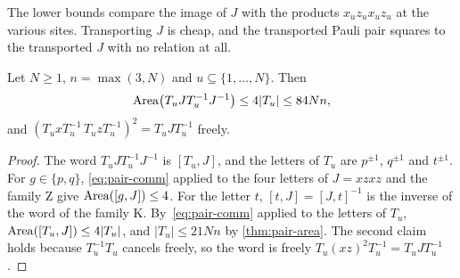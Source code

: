 The lower bounds compare the image of $J$ with the products $x_uz_ux_uz_u$ at the various sites. Transporting $J$ is cheap, and the
transported Pauli pair squares to the transported $J$ with no relation at all.

\begin{lemma}[Transporting $J$]\label{lem:J-transport}
Let $N\ge1$, $n=\max(3,N)$ and $u\subseteq\{1,\dots,N\}$. Then
\[
\operatorname{Area}\bigl(T_uJT_u^{-1}J^{-1}\bigr)\le4|T_u|\le84Nn,
\]
and $(T_uxT_u^{-1}\,T_uzT_u^{-1})^2=T_uJT_u^{-1}$ freely.
\end{lemma}

\begin{proof}
The word $T_uJT_u^{-1}J^{-1}$ is $[T_u,J]$, and the letters of $T_u$ are $p^{\pm1}$, $q^{\pm1}$ and $t^{\pm1}$. For $g\in\{p,q\}$,
\eqref{eq:pair-comm} applied to the four letters of $J=xzxz$ and the family \textsf{Z} give $\operatorname{Area}([g,J])\le4$. For the letter $t$,
$[t,J]=[J,t]^{-1}$ is the inverse of the word of the family \textsf{K}. By~\eqref{eq:pair-comm} applied to the letters of $T_u$,
$\operatorname{Area}([T_u,J])\le4|T_u|$, and $|T_u|\le21Nn$ by \cref{thm:pair-area}. The second claim holds because $T_u^{-1}T_u$ cancels freely, so the
word is freely $T_u(xz)^2T_u^{-1}=T_uJT_u^{-1}$.
\end{proof}
